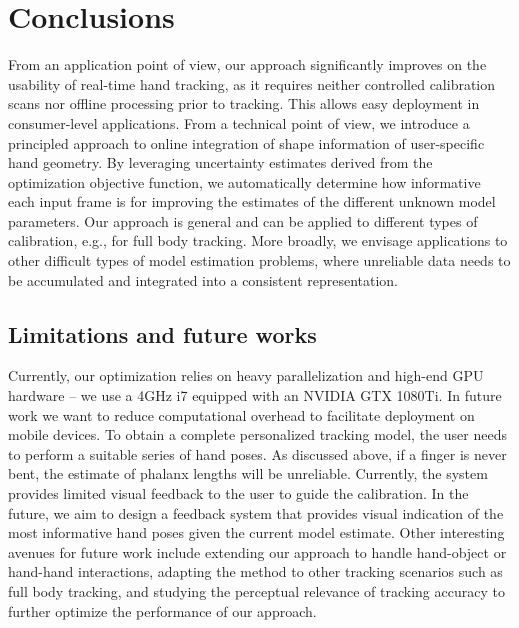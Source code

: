 \section{Conclusions}
From an application point of view, our approach significantly improves on the usability of real-time hand tracking, as it requires neither controlled calibration scans nor offline processing prior to tracking. This allows easy deployment in consumer-level applications. From a technical point of view, we introduce a principled approach to online integration of shape information of user-specific hand geometry. By leveraging uncertainty estimates derived from the optimization objective function, we automatically determine how informative each input frame is for improving the estimates of the different unknown model parameters. Our approach is general and can be applied to different types of calibration, e.g., for full body tracking. More broadly, we envisage applications to other difficult types of model estimation problems, where unreliable data needs to be accumulated and integrated into a consistent representation. 

\subsection*{Limitations and future works}
Currently, our optimization relies on heavy parallelization and high-end GPU hardware -- we use a 4GHz i7 equipped with an NVIDIA GTX 1080Ti. In future work we want to reduce computational overhead to facilitate deployment on mobile devices.
To obtain a complete personalized tracking model, the user needs to perform a suitable series of hand poses. As discussed above, if a finger is never bent, the estimate of phalanx lengths will be unreliable. Currently, the system provides limited visual feedback to the user to guide the calibration. In the future, we aim to design a feedback system that provides visual indication of the most informative hand poses given the current model estimate. 
Other interesting avenues for future work include extending our approach to handle hand-object or hand-hand interactions, adapting the method to other tracking scenarios such as full body tracking, and studying the perceptual relevance of tracking accuracy to further optimize the performance of our approach.



